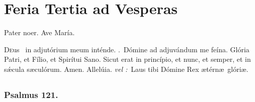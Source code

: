 \documentclass[12pt]{article} %
\newenvironment{response}{\leftskip 0in \setlength{\parindent}{0in}}{\vspace{2 mm}}
\def\vel{\textit{\textcolor{benred8}{vel :}}}
\let\oldRbar\Rbar
\renewcommand{\Rbar}{\textcolor{benred8}{\oldRbar .}}
\let\oldAbar\Abar
\renewcommand{\Abar}{\textcolor{benred8}{\oldAbar .}}
\let\oldgrealtcross\grealtcross
\renewcommand{\grealtcross}{\textcolor{benred8}{\oldgrealtcross}}
\begin{document}
\newpage


\section*{Feria Tertia ad Vesperas}

\begin{center}Pater noer. Ave Mar\'{i}a.\end{center}

\thispagestyle{plain}

\begin{response}\lettrine{D}{e}us \grealtcross\ in adjut\'{o}rium meum int\'{e}nde. \Rbar\ D\'{o}mine ad adjuv\'{a}ndum me fe\'{i}na. Gl\'{o}ria Patri, et F\'{i}lio, et Spir\'{i}tui Sano. Sicut erat in princ\'{i}pio, et nunc, et semper, et in s\'{\ae}cula s\ae cul\'{o}rum. Amen. Allel\'{u}ia. \vel\ Laus tibi D\'{o}mine Rex \ae t\'{e}rn\ae\ gl\'{o}ri\ae .

\end{response}


\subsection*{}



\def\greinitialformat#1{%
{\fontsize{60}{60}\selectfont #1}%
}

\gresetfirstlineaboveinitial{\small \textsc{ \textbf{\textcolor{benred8}{1 \Abar\ IV E}}}}{}%

\def\greinitialformat#1{%
{\fontsize{43}{43}\selectfont #1}%
}

\subsubsection*{Psalmus 121.}
\end{document}
